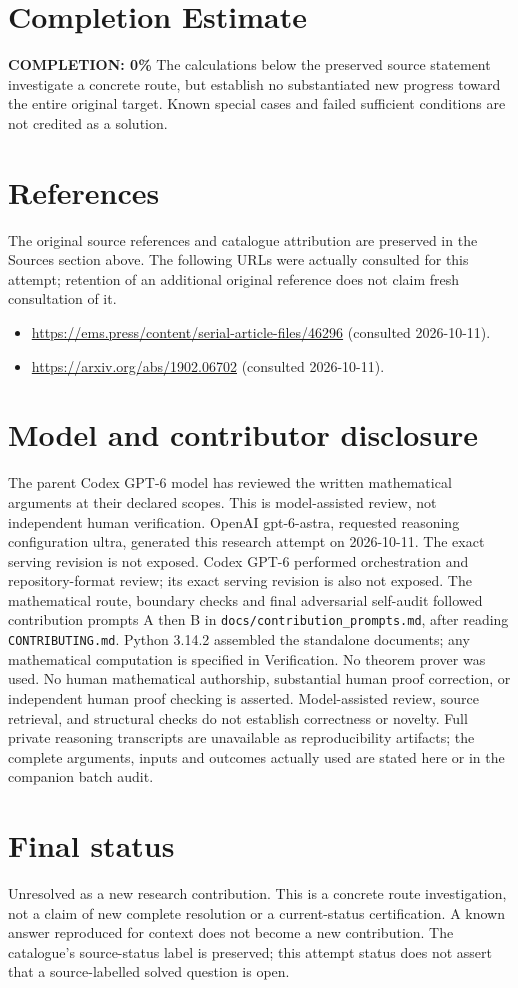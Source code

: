 \documentclass[11pt]{article}
\begin{document}
\section{Completion Estimate}
\noindent\textbf{COMPLETION: 0\%}
The calculations below the preserved source statement investigate a concrete route,
but establish no substantiated new progress toward the entire original target.
Known special cases and failed sufficient conditions are not credited as a solution.
\section{References}
The original source references and catalogue attribution are preserved in the
Sources section above. The following URLs were actually consulted for this attempt;
retention of an additional original reference does not claim fresh consultation of it.
\begin{itemize}
\item \url{https://ems.press/content/serial-article-files/46296} (consulted 2026-10-11). 
\item \url{https://arxiv.org/abs/1902.06702} (consulted 2026-10-11). 
\end{itemize}
\section{Model and contributor disclosure}
The parent Codex GPT-6 model has reviewed the written mathematical arguments at their declared scopes. This is model-assisted review, not independent human verification.
OpenAI gpt-6-astra, requested reasoning configuration ultra, generated this research
attempt on 2026-10-11. The exact serving revision is not exposed. Codex GPT-6
performed orchestration and repository-format review; its exact serving revision
is also not exposed. The mathematical route, boundary checks and final adversarial
self-audit followed contribution prompts A then B in
\texttt{docs/contribution\_prompts.md}, after reading \texttt{CONTRIBUTING.md}.
Python 3.14.2 assembled the standalone documents; any mathematical computation is
specified in Verification. No theorem prover was used. No human mathematical
authorship, substantial human proof correction, or independent human proof checking
is asserted. Model-assisted review, source retrieval, and structural checks do not
establish correctness or novelty. Full private reasoning transcripts are unavailable
as reproducibility artifacts; the complete arguments, inputs and outcomes actually
used are stated here or in the companion batch audit.
\section{Final status}
Unresolved as a new research contribution. This is a concrete route investigation,
not a claim of new complete resolution or a current-status certification. A known
answer reproduced for context does not become a new contribution. The catalogue's
source-status label is preserved; this attempt status does not assert that a
source-labelled solved question is open.
\end{document}
